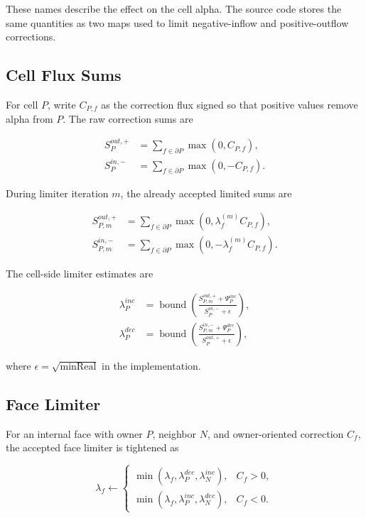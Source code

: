 \documentclass[11pt]{article}
\newcommand{\bnd}{\operatorname{bound}}
\begin{document}
These names describe the effect on the cell alpha.  The source code stores the
same quantities as two maps used to limit negative-inflow and positive-outflow
corrections.

\subsection{Cell Flux Sums}

For cell \(P\), write \(C_{P,f}\) as the correction flux signed so that positive
values remove alpha from \(P\).  The raw correction sums are

\begin{align}
  S_P^{out,+}
  &=
  \sum_{f\in\partial P}
  \max(0,C_{P,f}),
  \\
  S_P^{in,-}
  &=
  \sum_{f\in\partial P}
  \max(0,-C_{P,f}).
\end{align}

During limiter iteration \(m\), the already accepted limited sums are

\begin{align}
  S_{P,m}^{out,+}
  &=
  \sum_{f\in\partial P}
  \max(0,\lambda_f^{(m)}C_{P,f}),
  \\
  S_{P,m}^{in,-}
  &=
  \sum_{f\in\partial P}
  \max(0,-\lambda_f^{(m)}C_{P,f}).
\end{align}

The cell-side limiter estimates are

\begin{align}
  \lambda_P^{inc}
  &=
  \bnd
  \left(
    \frac{S_{P,m}^{out,+}+\Psi_P^{inc}}
         {S_P^{in,-}+\epsilon}
  \right),
  \\
  \lambda_P^{dec}
  &=
  \bnd
  \left(
    \frac{S_{P,m}^{in,-}+\Psi_P^{dec}}
         {S_P^{out,+}+\epsilon}
  \right),
  \label{eq:cell-limiters}
\end{align}

where \(\epsilon=\sqrt{\mathrm{minReal}}\) in the implementation.

\subsection{Face Limiter}

For an internal face with owner \(P\), neighbor \(N\), and owner-oriented
correction \(C_f\), the accepted face limiter is tightened as

\begin{equation}
  \lambda_f
  \leftarrow
  \begin{cases}
    \min(\lambda_f,\lambda_P^{dec},\lambda_N^{inc}),
      & C_f>0,\\
    \min(\lambda_f,\lambda_P^{inc},\lambda_N^{dec}),
      & C_f<0.
  \end{cases}
  \label{eq:face-limiter}
\end{equation}
\end{document}
